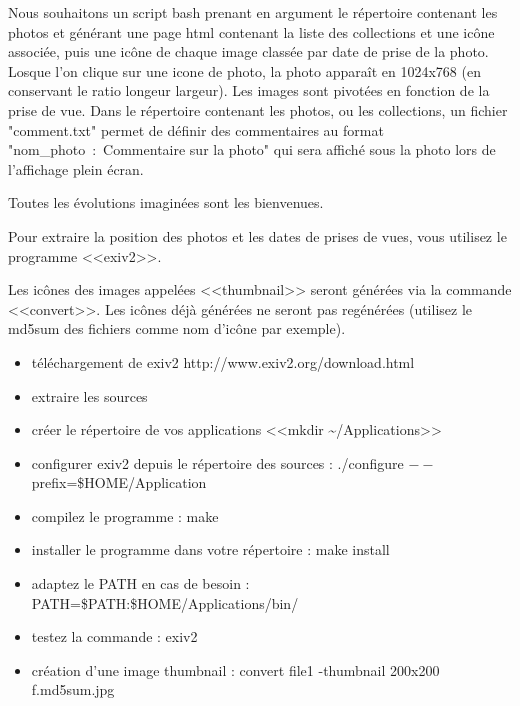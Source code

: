 \documentclass[11pt]{article}
\begin{document}
Nous souhaitons un script bash prenant en argument le répertoire contenant les photos et générant une page html contenant la liste des collections et une icône associée, puis une icône de chaque image classée par date de prise de la photo. Losque l'on clique sur une icone de photo, la photo apparaît en 1024x768 (en conservant le ratio longeur largeur). Les images sont pivotées en fonction de la prise de vue. Dans le répertoire contenant les photos, ou les collections, un fichier "comment.txt" permet de définir des commentaires au format "nom\_photo~:~Commentaire sur la photo" qui sera affiché sous la photo lors de l'affichage plein écran.

Toutes les évolutions imaginées sont les bienvenues.

Pour extraire la position des photos et les dates de prises de vues, vous utilisez le programme <<exiv2>>.

Les icônes des images appelées <<thumbnail>> seront générées via la commande <<convert>>. Les icônes déjà générées ne seront pas regénérées (utilisez le md5sum des fichiers comme nom d'icône par exemple).

\begin{solution}
\begin{itemize}
 \item téléchargement de exiv2 http://www.exiv2.org/download.html
 \item extraire les sources
 \item créer le répertoire de vos applications <<mkdir \textasciitilde{}/Applications>>
 \item configurer exiv2 depuis le répertoire des sources : ./configure $--$prefix=\$HOME/Application
 \item compilez le programme : make
 \item installer le programme dans votre répertoire : make install
 \item adaptez le PATH en cas de besoin : PATH=\$PATH:\$HOME/Applications/bin/
 \item testez la commande : exiv2
 \item création d'une image thumbnail : convert file1 -thumbnail 200x200 f.md5sum.jpg
\end{itemize}
\end{solution}
\end{document}
